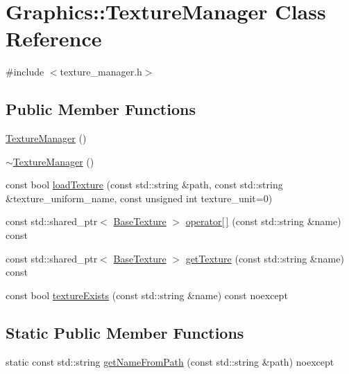 \hypertarget{class_graphics_1_1_texture_manager}{}\section{Graphics\+:\+:Texture\+Manager Class Reference}
\label{class_graphics_1_1_texture_manager}


{\ttfamily \#include $<$texture\+\_\+manager.\+h$>$}

\subsection*{Public Member Functions}
\begin{DoxyCompactItemize}
\item 
\hyperlink{class_graphics_1_1_texture_manager_aa04c4948f0bf5641454b649c8ddd8ebd}{Texture\+Manager} ()
\item 
\hyperlink{class_graphics_1_1_texture_manager_a37197d06634adca1715ce58a1d46a98f}{$\sim$\+Texture\+Manager} ()
\item 
const bool \hyperlink{class_graphics_1_1_texture_manager_aaf3f4c4eae602c748482950639335dee}{load\+Texture} (const std\+::string \&path, const std\+::string \&texture\+\_\+uniform\+\_\+name, const unsigned int texture\+\_\+unit=0)
\item 
const std\+::shared\+\_\+ptr$<$ \hyperlink{class_graphics_1_1_base_texture}{Base\+Texture} $>$ \hyperlink{class_graphics_1_1_texture_manager_ae2c15e90de3a93f02609f5da3a050e5c}{operator\mbox{[}$\,$\mbox{]}} (const std\+::string \&name) const 
\item 
const std\+::shared\+\_\+ptr$<$ \hyperlink{class_graphics_1_1_base_texture}{Base\+Texture} $>$ \hyperlink{class_graphics_1_1_texture_manager_a4e969b690676e3f5f764fa2a2c67763b}{get\+Texture} (const std\+::string \&name) const 
\item 
const bool \hyperlink{class_graphics_1_1_texture_manager_a7ea7b24ff436064895eece7804e4c18d}{texture\+Exists} (const std\+::string \&name) const noexcept
\end{DoxyCompactItemize}
\subsection*{Static Public Member Functions}
\begin{DoxyCompactItemize}
\item 
static const std\+::string \hyperlink{class_graphics_1_1_texture_manager_a5011ab2205d5dd2e4d0fcecbf91a00cc}{get\+Name\+From\+Path} (const std\+::string \&path) noexcept
\end{DoxyCompactItemize}

